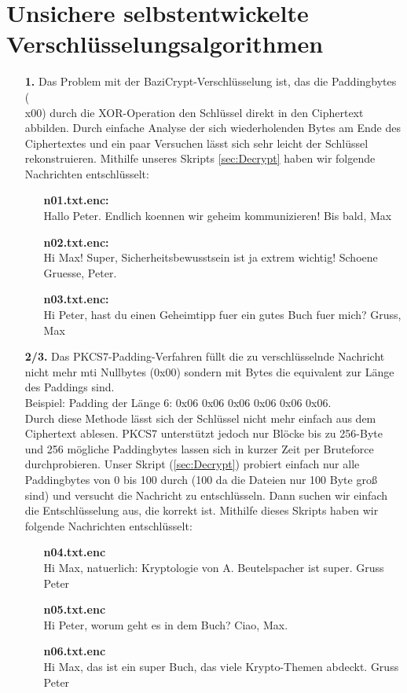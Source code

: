 \documentclass[a4paper,12bpt]{scrartcl}
\begin{document}
\section{Unsichere selbstentwickelte Verschlüsselungsalgorithmen}
\label{sec:crypto}

\begin{enumerate}
  \item[\bfseries 1.]
      Das Problem mit der BaziCrypt-Verschlüsselung ist, das die Paddingbytes (\\x00)
      durch die XOR-Operation den Schlüssel direkt in den Ciphertext abbilden. Durch einfache
      Analyse der sich wiederholenden Bytes am Ende des Ciphertextes und ein paar Versuchen
      lässt sich sehr leicht der Schlüssel rekonstruieren. Mithilfe unseres Skripts \ref{sec:Decrypt}
      haben wir folgende Nachrichten entschlüsselt:
      \begin{itemize}
        \item[] \textbf{n01.txt.enc:}\\ Hallo Peter. Endlich koennen wir geheim kommunizieren! Bis bald, Max
        \item[] \textbf{n02.txt.enc:}\\ Hi Max! Super, Sicherheitsbewusstsein ist ja extrem wichtig! Schoene Gruesse, Peter.
        \item[] \textbf{n03.txt.enc:}\\ Hi Peter, hast du einen Geheimtipp fuer ein gutes Buch fuer mich? Gruss, Max
      \end{itemize}
  \item[\bfseries 2/3.]
      Das PKCS7-Padding-Verfahren füllt die zu verschlüsselnde Nachricht nicht mehr mti
      Nullbytes (0x00) sondern mit Bytes die equivalent zur Länge des Paddings sind.\\
      Beispiel: Padding der Länge 6: 0x06 0x06 0x06 0x06 0x06 0x06.\\
      Durch diese Methode lässt sich der Schlüssel nicht mehr einfach aus dem Ciphertext
      ablesen. PKCS7 unterstützt jedoch nur Blöcke bis zu 256-Byte und 256 mögliche Paddingbytes
      lassen sich in kurzer Zeit per Bruteforce durchprobieren. Unser Skript (\ref{sec:Decrypt})
      probiert einfach nur alle Paddingbytes von 0 bis 100 durch (100 da die Dateien nur 100 Byte
      groß sind) und versucht die Nachricht zu entschlüsseln. Dann suchen wir einfach die
      Entschlüsselung aus, die korrekt ist. Mithilfe dieses Skripts haben wir folgende Nachrichten
      entschlüsselt:
      \begin{itemize}
        \item [] \textbf{n04.txt.enc}\\Hi Max, natuerlich: Kryptologie von A. Beutelspacher ist super. Gruss Peter
        \item [] \textbf{n05.txt.enc}\\Hi Peter, worum geht es in dem Buch? Ciao, Max.
        \item [] \textbf{n06.txt.enc}\\Hi Max, das ist ein super Buch, das viele Krypto-Themen abdeckt. Gruss Peter
      \end{itemize}
\end{enumerate}
\end{document}

